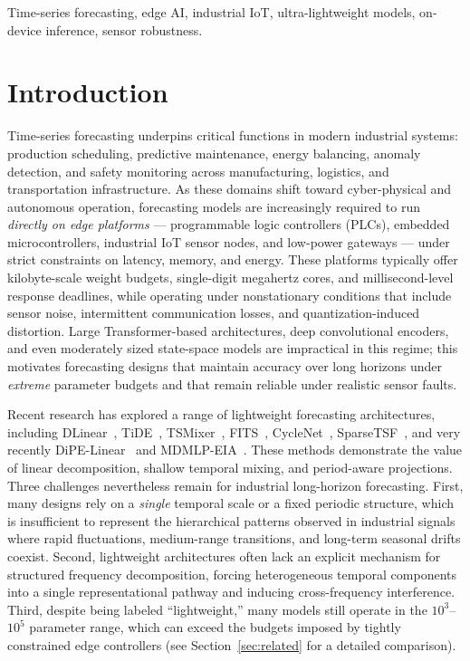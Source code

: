 \documentclass[journal]{IEEEtran}
\theoremstyle{remark}
\begin{document}
\begin{IEEEkeywords}
Time-series forecasting, edge AI, industrial IoT, ultra-lightweight
models, on-device inference, sensor robustness.
\end{IEEEkeywords}

\section{Introduction}
\label{sec:introduction}

Time-series forecasting underpins critical functions in modern
industrial systems: production scheduling, predictive maintenance,
energy balancing, anomaly detection, and safety monitoring across
manufacturing, logistics, and transportation infrastructure. As these
domains shift toward cyber-physical and autonomous operation,
forecasting models are increasingly required to run \emph{directly on
edge platforms} --- programmable logic controllers (PLCs), embedded
microcontrollers, industrial IoT sensor nodes, and low-power gateways
--- under strict constraints on latency, memory, and energy. These
platforms typically offer kilobyte-scale weight budgets, single-digit
megahertz cores, and millisecond-level response deadlines, while
operating under nonstationary conditions that include sensor noise,
intermittent communication losses, and quantization-induced
distortion. Large Transformer-based architectures, deep convolutional
encoders, and even moderately sized state-space models are
impractical in this regime; this motivates forecasting designs that
maintain accuracy over long horizons under \emph{extreme} parameter
budgets and that remain reliable under realistic sensor faults.

Recent research has explored a range of lightweight forecasting
architectures, including
DLinear~\cite{Zeng2023DLinear}, TiDE~\cite{Das2024TiDE},
TSMixer~\cite{Chen2023TSMixer}, FITS~\cite{Xu2024FITS},
CycleNet~\cite{Lin2024CycleNet},
SparseTSF~\cite{Lin2024SparseTSF}, and very recently
DiPE-Linear~\cite{Wintertee2026DiPELinear} and
MDMLP-EIA~\cite{Zh2026MDMLPEIA}. These methods demonstrate the value
of linear decomposition, shallow temporal mixing, and period-aware
projections. Three challenges nevertheless remain for industrial
long-horizon forecasting. First, many designs rely on a
\emph{single} temporal scale or a fixed periodic structure, which is
insufficient to represent the hierarchical patterns observed in
industrial signals where rapid fluctuations, medium-range
transitions, and long-term seasonal drifts coexist. Second,
lightweight architectures often lack an explicit mechanism for
structured frequency decomposition, forcing heterogeneous temporal
components into a single representational pathway and inducing
cross-frequency interference. Third, despite being labeled
``lightweight,'' many models still operate in the
$10^{3}$--$10^{5}$ parameter range, which can exceed the budgets
imposed by tightly constrained edge controllers
(see Section~\ref{sec:related} for a detailed comparison).
\end{document}
